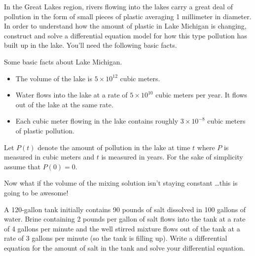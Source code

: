 \begin{problem}
     In the Great Lakes region, rivers flowing into the lakes carry a great deal of
     pollution in the form of small pieces of plastic averaging 1 millimeter in diameter.
     In order to understand how the amount of plastic in Lake Michigan is changing,
     construct and solve a differential equation model for how this type pollution has
     built up in the lake.  You'll need the following basic facts.  

     Some basic facts about Lake Michigan.
     \begin{itemize}
         \item The volume of the lake is $5 \times 10^{12}$ cubic meters.
         \item Water flows into the lake at a rate of $5 \times 10^{10}$ cubic meters per
             year.  It flows out of the lake at the same rate.
         \item Each cubic meter flowing in the lake contains roughly $3 \times 10^{-8}$
             cubic meters of plastic pollution.
     \end{itemize}

     Let $P(t)$ denote the amount of pollution in the lake at time $t$ where $P$ is
     measured in cubic meters and $t$ is measured in years.  For the sake of simplicity
     assume that $P(0) = 0$.
\end{problem}

Now what if the volume of the mixing solution isn't staying constant \ldots this is going
to be awesome!
\begin{problem}
    A 120-gallon tank initially contains 90 pounds of salt dissolved in 100 gallons of
    water.  Brine containing 2 pounds per gallon of salt flows into the tank at a rate of
    4 gallons per minute and the well stirred mixture flows out of the tank at a rate of 3
    gallons per minute (so the tank is filling up).  Write a differential equation for the
    amount of salt in the tank and solve your differential equation.
\end{problem}

